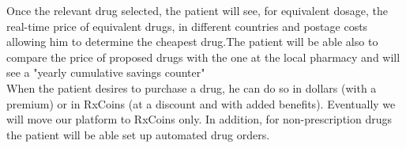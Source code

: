 Once the relevant drug selected, the patient will see, for equivalent dosage, the real-time price of equivalent drugs, in different countries and postage costs allowing him to determine the cheapest drug.The patient will be able also to compare the price of proposed drugs with the one at the local pharmacy and will see a "yearly cumulative savings counter" \\

When the patient desires to purchase a drug, he can do so in dollars (with a premium) or in RxCoins (at a discount and with added benefits). 
Eventually we will move our platform to RxCoins only.
In addition, for non-prescription drugs the patient will be able set up automated drug orders.
